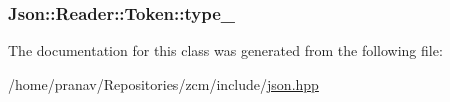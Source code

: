 \subsubsection[{\texorpdfstring{type\+\_\+}{type_}}]{ Json\+::\+Reader\+::\+Token\+::type\+\_\+}\hypertarget{classJson_1_1Reader_1_1Token_aa0f06d0105ec3d8cb42427c66b991bad}{}\label{classJson_1_1Reader_1_1Token_aa0f06d0105ec3d8cb42427c66b991bad}


The documentation for this class was generated from the following file\+:\begin{DoxyCompactItemize}
\item 
/home/pranav/\+Repositories/zcm/include/\hyperlink{json_8hpp}{json.\+hpp}\end{DoxyCompactItemize}
